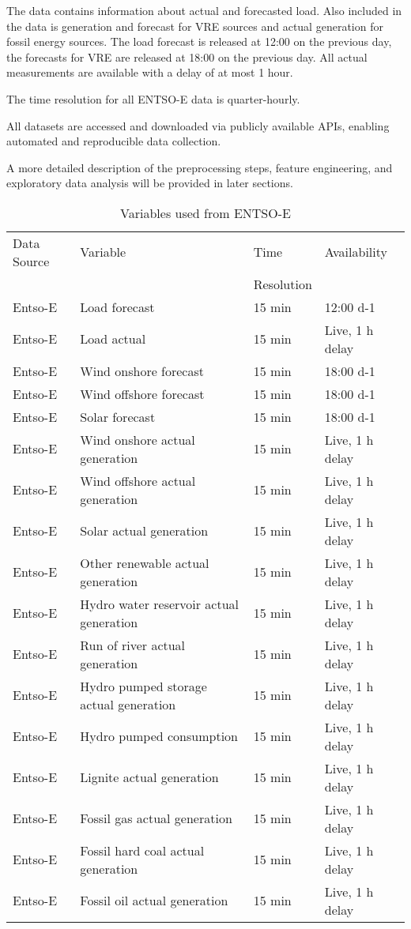 \documentclass[class=scrbook, crop=false]{standalone}
\begin{document}
The data contains information about actual and forecasted load. Also included in the data is generation and forecast for VRE sources and actual generation for fossil energy sources. 
The load forecast is released at 12:00 on the previous day, the forecasts for VRE are released at 18:00 on the previous day. All actual measurements are available with a delay of at most 1 hour.

The time resolution for all ENTSO-E data is quarter-hourly.

All datasets are accessed and downloaded via publicly available APIs, enabling automated and reproducible data collection.

A more detailed description of the preprocessing steps, feature engineering, and exploratory data analysis will be provided in later sections.


\begin{table}[]
\centering
\begin{tabular}{l|l|l|l}
 Data Source & Variable &  Time  & Availability  \\
 &&Resolution&\\\hline
 Entso-E & Load forecast & 15 min  & 12:00 d-1 \\
 Entso-E & Load actual & 15 min  &Live, 1 h delay \\
 Entso-E & Wind onshore forecast & 15 min  & 18:00 d-1\\
 Entso-E & Wind offshore forecast & 15 min & 18:00 d-1 \\
 Entso-E & Solar forecast & 15 min & 18:00 d-1 \\
 Entso-E & Wind onshore actual generation & 15 min  &Live, 1 h delay\\
 Entso-E & Wind offshore actual generation & 15 min &Live, 1 h delay \\
 Entso-E & Solar actual generation & 15 min & Live, 1 h delay \\
 Entso-E & Other renewable actual generation & 15 min &Live, 1 h delay \\
 Entso-E & Hydro water reservoir actual generation & 15 min & Live, 1 h delay \\
 Entso-E & Run of river actual generation & 15 min &Live, 1 h delay \\
 Entso-E & Hydro pumped storage actual generation & 15 min & Live, 1 h delay \\
 Entso-E & Hydro pumped consumption & 15 min & Live, 1 h delay \\
 Entso-E & Lignite actual generation & 15 min & Live, 1 h delay \\
 Entso-E & Fossil gas actual generation & 15 min & Live, 1 h delay \\
 Entso-E & Fossil hard coal actual generation & 15 min & Live, 1 h delay \\
 Entso-E & Fossil oil actual generation & 15 min & Live, 1 h delay \\
  
\end{tabular}
\caption{Variables used from ENTSO-E}
\label{Table::Energy_Data_Entsoe}
\end{table}
\end{document}
